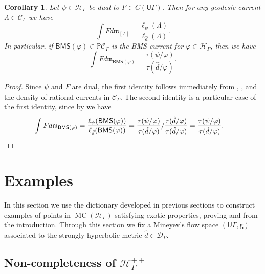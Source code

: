 \documentclass[twoside]{amsart}
\newtheorem{corollary}[theorem]{Corollary}
\theoremstyle{definition}
\numberwithin{equation}{section}
\numberwithin{theorem}{section}
\newcommand{\msf}[1]{\mathsf{#1}}
\newcommand{\bbP}{\mathbb{P}}
\newcommand{\calC}{\mathcal{C}}
\newcommand{\calD}{\mathcal{D}}
\newcommand{\calH}{\mathcal{H}}
\newcommand{\scrH}{\mathscr{H}}
\newcommand{\frakm}{\mathfrak{m}}
\newcommand{\G}{\Gamma}
\newcommand{\Lam}{\Lambda}
\newcommand{\p}{\psi}
\newcommand{\UG}{\msf{U}\G}
\newcommand{\BMS}{\msf{BMS}}
\DeclareMathOperator{\MC}{MC}
\begin{document}
\begin{corollary}\label{cor:dualintegral}
    Let $\p\in \calH_\G$ be dual to $F\in C(\UG)$. Then for any geodesic current $\Lam\in \calC_\G$ we have
\begin{equation*}
    \int{F}{d\frakm_{[\Lam]}=\frac{\ell_{\p}(\Lam)}{\ell_{\hat d}(\Lam)}}.
\end{equation*}
In particular, if $\BMS(\varphi)\in \bbP\calC_\G$ is the BMS current for $\varphi\in \calH_\G$, then we have
\begin{equation*}
    \int{F}{d\frakm_{\BMS(\varphi)}}=\frac{\tau(\p/\varphi)}{\tau(\hat{d}/\varphi)}.
\end{equation*}
\end{corollary}

\begin{proof}
    Since $\p$ and $F$ are dual, the first identity follows immediately from , , and the density of rational currents in $\calC_\G$. The second identity is a particular case of the first identity, since by  we have
\begin{align*}
    \int{F}{d\frakm_{\BMS(\varphi)}}& =\frac{\ell_\p(\BMS(\varphi))}{\ell_{\hat d}(\BMS(\varphi))}
     = \frac{\tau(\p/\varphi)}{\tau(\hat d/\varphi)}/\frac{\tau(\hat d/\varphi)}{\tau(\hat d/\varphi)}=\frac{\tau(\p/\varphi)}{\tau(\hat d/\varphi)}. \qedhere
\end{align*}
\end{proof}


\section{Examples}\label{sec:examples}

In this section we use the dictionary developed in previous sections to construct examples of points in $\MC(\scrH_\G)$ satisfying exotic properties, proving  and  from the introduction. Through this section we fix a Mineyev's flow space $(\UG,\msf{g})$ associated to the strongly hyperbolic metric $\hat d\in \calD_\G$.

 
\subsection{Non-completeness of $\scrH_\G^{++}$}\label{subsec:noncomplete} 
\end{document}
